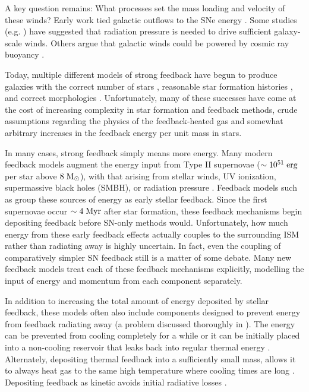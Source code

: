A key question remains: What processes set the mass loading and velocity of
these winds?  Early work tied galactic outflows to the SNe energy
\citep{Springel2003}.  Some studies (e.g. \citealt{Murray2005,Krumholz2013})
have suggested that radiation pressure is needed to drive sufficient
galaxy-scale winds.  Others argue that galactic winds could be powered by cosmic
ray buoyancy \citep{Ipavich1975,Breitschwerdt1991,Socrates2008}.

Today, multiple different models of strong feedback have begun to produce
galaxies with the correct number of stars \citep{Aumer2013}, reasonable star
formation histories \citep{Stinson2013,Agertz2014,Munshi2013}, and correct
morphologies \citep{Guedes2011,Brook2012,Christensen2014}.   Unfortunately, many
of these successes have come at the cost of increasing complexity in star
formation and feedback methods, crude assumptions regarding the physics of the
feedback-heated gas and somewhat arbitrary increases in the feedback energy per
unit mass in stars.  

In many cases, strong feedback simply means more energy.  Many modern feedback
models augment the energy input from Type II supernovae ($\sim10^{51}\;
\rm{erg}$ per star above $8\; \rm{M_\odot}$), with that arising from stellar
winds, UV ionization, supermassive black holes (SMBH), or radiation pressure
\citep{Vogelsberger2013, Agertz2014}.  Feedback models such as
\citet{Stinson2013} group these sources of energy as early stellar feedback.
Since the first supernovae occur $\sim4\; \rm{Myr}$ after star formation, these
feedback mechanisms begin depositing feedback before SN-only methods would.
Unfortunately, how much energy from these early feedback effects actually
couples to the surrounding ISM rather than radiating away is highly uncertain.
In fact, even the coupling of comparatively simpler SN feedback still is a
matter of some debate.  Many new feedback models \citep{Agertz2013, Aumer2013,
Hopkins2013} treat each of these feedback mechanisms explicitly, modelling the
input of energy and momentum from each component separately.  

In addition to increasing the total amount of energy deposited by stellar
feedback, these models often also include components designed to prevent energy
from feedback radiating away (a problem discussed thoroughly in
\citealt{Thacker2000}).   The energy can be prevented from cooling completely
for a while \citep{Stinson2013} or it can be initially placed into a non-cooling
reservoir that leaks back into regular thermal energy \citep{Agertz2013}.
Alternately, depositing thermal feedback into a sufficiently small mass, allows
it to always heat gas to the same high temperature where cooling times are long
\citep{DallaVecchia2012}.  Depositing feedback as kinetic avoids initial
radiative losses \citet{Springel2003,Agertz2013,Hopkins2013}.  

